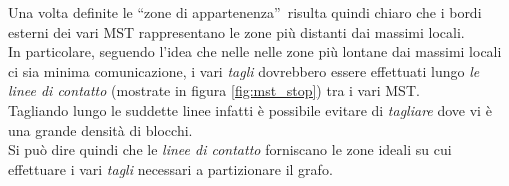 {Una volta definite le \textquotedblleft zone di appartenenza\textquotedblright~risulta quindi chiaro che i bordi esterni dei vari MST rappresentano le zone più distanti dai massimi locali.\\
In particolare, seguendo l'idea che nelle nelle zone più lontane dai massimi locali ci sia minima comunicazione, i vari \textit{tagli} dovrebbero essere effettuati lungo \emph{le linee di contatto} (mostrate in figura \ref{fig:mst_stop}) tra i vari MST.\\
Tagliando lungo le suddette linee infatti è possibile evitare di \textit{tagliare} dove vi è una grande densità di blocchi.\\
Si può dire quindi che le \textit{linee di contatto} forniscano le zone ideali su cui effettuare i vari \textit{tagli} necessari a partizionare il grafo.

}
